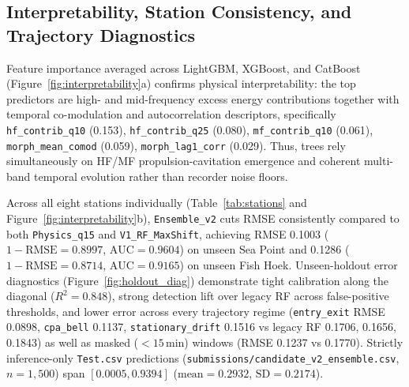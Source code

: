 \documentclass[10pt,a4paper]{article}
\begin{document}
\subsection{Interpretability, Station Consistency, and Trajectory Diagnostics}
Feature importance averaged across LightGBM, XGBoost, and CatBoost (Figure~\ref{fig:interpretability}a) confirms physical interpretability: the top predictors are high- and mid-frequency excess energy contributions together with temporal co-modulation and autocorrelation descriptors, specifically \texttt{hf\_contrib\_q10} (0.153), \texttt{hf\_contrib\_q25} (0.080), \texttt{mf\_contrib\_q10} (0.061), \texttt{morph\_mean\_comod} (0.059), \texttt{morph\_lag1\_corr} (0.029). Thus, trees rely simultaneously on HF/MF propulsion-cavitation emergence and coherent multi-band temporal evolution rather than recorder noise floors.

Across all eight stations individually (Table~\ref{tab:stations} and Figure~\ref{fig:interpretability}b), \texttt{Ensemble\_v2} cuts RMSE consistently compared to both \texttt{Physics\_q15} and \texttt{V1\_RF\_MaxShift}, achieving RMSE 0.1003 ($1-\mathrm{RMSE} = 0.8997$, $\mathrm{AUC} = 0.9604$) on unseen Sea Point and 0.1286 ($1-\mathrm{RMSE} = 0.8714$, $\mathrm{AUC} = 0.9165$) on unseen Fish Hoek. Unseen-holdout error diagnostics (Figure~\ref{fig:holdout_diag}) demonstrate tight calibration along the diagonal ($R^2 = 0.848$), strong detection lift over legacy RF across false-positive thresholds, and lower error across every trajectory regime (\texttt{entry\_exit} RMSE 0.0898, \texttt{cpa\_bell} 0.1137, \texttt{stationary\_drift} 0.1516 vs legacy RF 0.1706, 0.1656, 0.1843) as well as masked ($<15$\,min) windows (RMSE 0.1237 vs 0.1770). Strictly inference-only \texttt{Test.csv} predictions (\texttt{submissions/candidate\_v2\_ensemble.csv}, $n=1,500$) span $[0.0005, 0.9394]$ ($\mathrm{mean} = 0.2932$, $\mathrm{SD} = 0.2174$).
\end{document}

